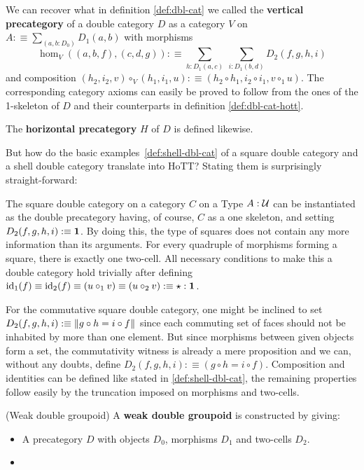 \begin{defn}
We can recover what in definition \ref{def:dbl-cat} we called the \textbf{vertical
precategory} of a double category $D$ as a category $V$ on $A :\equiv
\sum_{(a,b : D_0)} D_1(a,b)$ with morphisms
\begin{equation*}
\hom_V((a,b,f),(c,d,g)) :\equiv \sum_{h:D_1(a,c)} ~ \sum_{i:D_1(b,d)} D_2(f,g,h,i)
\end{equation*}
and composition $(h_2,i_2,v) \circ_V (h_1,i_1,u) :\equiv
(h_2 \circ h_1, i_2 \circ i_1, v \circ_1 u)$.
The corresponding category axioms can easily be proved to follow from the ones
of the 1-skeleton of $D$ and their counterparts in definition \ref{def:dbl-cat-hott}.

The \textbf{horizontal precategory} $H$ of $D$ is defined likewise.
\end{defn}

But how do the basic examples~\ref{def:shell-dbl-cat} of a square double category
and a shell double category translate into HoTT? Stating them is surprisingly
straight-forward:

\begin{example}
The square double category on a category $C$ on a Type $A : \mathcal{U}$ can be instantiated
as the double precategory having, of course, $C$ as a one skeleton, and setting
$D_2(f,g,h,i) :\equiv \mathbf{1}$.
By doing this, the type of squares does not contain any more information than its
arguments.
For every quadruple of morphisms forming a square, there is exactly one two-cell.
All necessary conditions to make this a double category hold trivially after
defining $\operatorname{id}_1(f) \equiv \operatorname{id}_2(f) \equiv (u \circ_1 v) \equiv (u \circ_2 v) :\equiv
\star : \mathbf{1}$.

For the commutative square double category, one might be inclined to set
$D_2(f,g,h,i) :\equiv \left\Vert g \circ h = i \circ f\right\Vert_{}$ since each commuting
set of faces should not be inhabited by more than one element.
But since morphisms between given objects form a set, the commutativity witness
is already a mere proposition and we can, without any doubts, define
$D_2(f,g,h,i) :\equiv (g \circ h = i \circ f)$.
Composition and identities can be defined like stated in \ref{def:shell-dbl-cat},
the remaining properties follow easily by the truncation imposed on morphisms
and two-cells.
\end{example}

\begin{defn}(Weak double groupoid)
A \textbf{weak double groupoid} is constructed by giving:
\begin{itemize}
\item A precategory $D$ with objects $D_0$, morphisms $D_1$ and two-cells $D_2$.
\item 
\end{itemize}
\end{defn}

